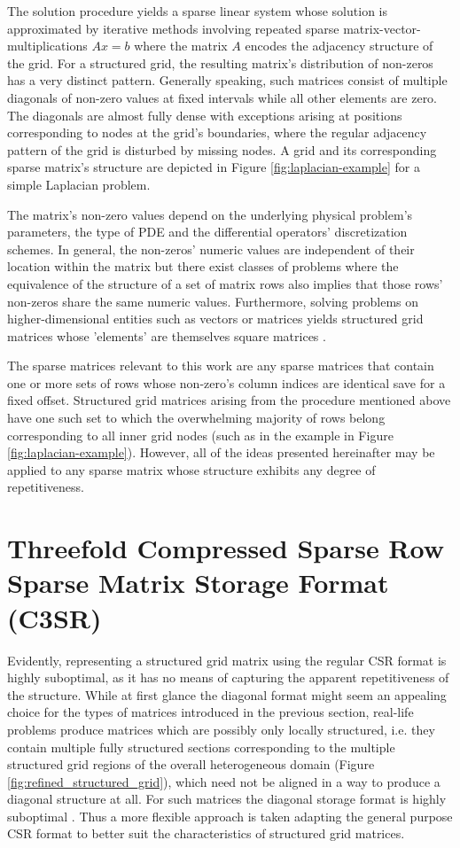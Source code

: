 \documentclass{article}
\begin{document}
    The solution procedure yields a sparse linear system whose solution is approximated by iterative methods involving repeated sparse matrix-vector-multiplications $Ax = b$ where the matrix $A$ encodes the adjacency structure of the grid. For a structured grid, the resulting matrix's distribution of non-zeros has a very distinct pattern. Generally speaking, such matrices consist of multiple diagonals of non-zero values at fixed intervals while all other elements are zero. The diagonals are almost fully dense with exceptions arising at positions corresponding to nodes at the grid's boundaries, where the regular adjacency pattern of the grid is disturbed by missing nodes. A grid and its corresponding sparse matrix's structure are depicted in Figure \ref{fig:laplacian-example} for a simple Laplacian problem.

    The matrix's non-zero values depend on the underlying physical problem's parameters, the type of PDE and the differential operators' discretization schemes. In general, the non-zeros' numeric values are independent of their location within the matrix but there exist classes of problems where the equivalence of the structure of a set of matrix rows also implies that those rows' non-zeros share the same numeric values. Furthermore, solving problems on higher-dimensional entities such as vectors or matrices yields structured grid matrices whose 'elements' are themselves square matrices \cite{Godwin2013}.

    The sparse matrices relevant to this work are any sparse matrices that contain one or more sets of rows whose non-zero's column indices are identical save for a fixed offset. Structured grid matrices arising from the procedure mentioned above have one such set to which the overwhelming majority of rows belong corresponding to all inner grid nodes (such as in the example in Figure \ref{fig:laplacian-example}). However, all of the ideas presented hereinafter may be applied to any sparse matrix whose structure exhibits any degree of repetitiveness.

\section{Threefold Compressed Sparse Row Sparse Matrix Storage Format (C3SR)}

  Evidently, representing a structured grid matrix using the regular CSR format is highly suboptimal, as it has no means of capturing the apparent repetitiveness of the structure. While at first glance the diagonal format might seem an appealing choice for the types of matrices introduced in the previous section, real-life problems produce matrices which are possibly only locally structured, i.e. they contain multiple fully structured sections corresponding to the multiple structured grid regions of the overall heterogeneous domain (Figure \ref{fig:refined_structured_grid}), which need not be aligned in a way to produce a diagonal structure at all. For such matrices the diagonal storage format is highly suboptimal \cite{Bell2011}. Thus a more flexible approach is taken adapting the general purpose CSR format to better suit the characteristics of structured grid matrices.
\end{document}
